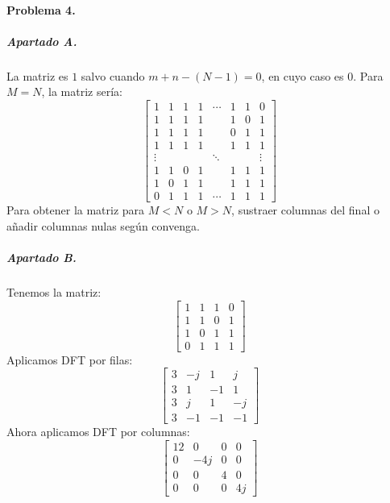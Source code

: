 \finishpage


\startpage

\paragraph{Problema 4.}

\subparagraph{Apartado A.}

La matriz es $1$ salvo cuando $m + n - (N - 1) = 0$, en cuyo caso es $0$.
Para $M = N$, la matriz sería:
%
\begin{equation*}
  \begin{bmatrix}
    1 & 1 & 1 & 1 & \cdots & 1 & 1 & 0 \\
    1 & 1 & 1 & 1 &        & 1 & 0 & 1 \\
    1 & 1 & 1 & 1 &        & 0 & 1 & 1 \\
    1 & 1 & 1 & 1 &        & 1 & 1 & 1 \\

    \vdots  & & & & \ddots & & & \vdots\\

    1 & 1 & 0 & 1 &        & 1 & 1 & 1 \\
    1 & 0 & 1 & 1 &        & 1 & 1 & 1 \\
    0 & 1 & 1 & 1 & \cdots & 1 & 1 & 1
  \end{bmatrix}
\end{equation*}
%
Para obtener la matriz para $M < N$ o $M > N$, sustraer columnas del final o añadir
columnas nulas según convenga.

\subparagraph{Apartado B.}

Tenemos la matriz:
%
\begin{equation*}
  \begin{bmatrix}
    1 & 1 & 1 & 0 \\
    1 & 1 & 0 & 1 \\
    1 & 0 & 1 & 1 \\
    0 & 1 & 1 & 1
  \end{bmatrix}
\end{equation*}
%
Aplicamos DFT por filas:
%
\begin{equation*}
  \begin{bmatrix}
     3 & -j &  1 &  j \\
     3 &  1 & -1 &  1 \\
     3 &  j &  1 & -j \\
     3 & -1 & -1 & -1
  \end{bmatrix}
\end{equation*}
%
Ahora aplicamos DFT por columnas:
%
\begin{equation*}
  \begin{bmatrix}
    12 &  0 &  0 &  0 \\
     0 &-4j &  0 &  0 \\
     0 &  0 &  4 &  0 \\
     0 &  0 &  0 & 4j
  \end{bmatrix}
\end{equation*}
%

\finishpage

